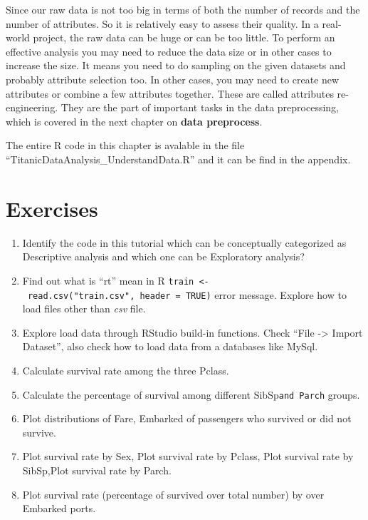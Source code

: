 \documentclass[
]{book}
\makeatletter
\newenvironment{kframe}{%
\medskip{}
\setlength{\fboxsep}{.8em}
 \def\at@end@of@kframe{}%
 \ifinner\ifhmode%
  \def\at@end@of@kframe{\end{minipage}}%
  \begin{minipage}{\columnwidth}%
 \fi\fi%
 \def\FrameCommand##1{\hskip\@totalleftmargin \hskip-\fboxsep
 \colorbox{shadecolor}{##1}\hskip-\fboxsep
     \hskip-\linewidth \hskip-\@totalleftmargin \hskip\columnwidth}%
 \MakeFramed {\advance\hsize-\width
   \@totalleftmargin\z@ \linewidth\hsize
   \@setminipage}}%
 {\par\unskip\endMakeFramed%
 \at@end@of@kframe}
\newenvironment{rmdblock}[1]
  {
  \begin{itemize}
  \renewcommand{\labelitemi}{
    \raisebox{-.7\height}[0pt][0pt]{
      {\setkeys{Gin}{width=3em,keepaspectratio}\texttt{[image: images/\#1]}}
    }
  }
  \setlength{\fboxsep}{1em}
  \begin{kframe}
  \item
  }
  {
  \end{kframe}
  \end{itemize}
  }
\newenvironment{rmdinfo}
  {\begin{rmdblock}{info}}
  {\end{rmdblock}}
\makeatother
\begin{document}
Since our raw data is not too big in terms of both the number of records and the number of attributes. So it is relatively easy to assess their quality. In a real-world project, the raw data can be huge or can be too little. To perform an effective analysis you may need to reduce the data size or in other cases to increase the size. It means you need to do sampling on the given datasets and probably attribute selection too. In other cases, you may need to create new attributes or combine a few attributes together. These are called attributes re-engineering. They are the part of important tasks in the data preprocessing, which is covered in the next chapter on \textbf{data preprocess}.

\begin{rmdinfo}
The entire R code in this chapter is avalable in the file ``TitanicDataAnalysis\_UnderstandData.R'' and it can be find in the appendix.
\end{rmdinfo}

\hypertarget{exercises-3}{%
\section*{Exercises}\label{exercises-3}}


\begin{enumerate}
\def\labelenumi{\arabic{enumi}.}
\item
  Identify the code in this tutorial which can be conceptually categorized as Descriptive analysis and which one can be Exploratory analysis?
\item
  Find out what is ``rt'' mean in R \texttt{train\ \textless{}-\ read.csv("train.csv",\ header\ =\ TRUE)} error message. Explore how to load files other than \emph{csv} file.
\item
  Explore load data through RStudio build-in functions. Check ``File -\textgreater{} Import Dataset'', also check how to load data from a databases like MySql.
\item
  Calculate survival rate among the three Pclass.
\item
  Calculate the percentage of survival among different SibSp\texttt{and\ Parch} groups.
\item
  Plot distributions of Fare, Embarked of passengers who survived or did not survive.
\item
  Plot survival rate by Sex, Plot survival rate by Pclass, Plot survival rate by SibSp,Plot survival rate by Parch.
\item
  Plot survival rate (percentage of survived over total number) by over Embarked ports.
\end{enumerate}
\end{document}
